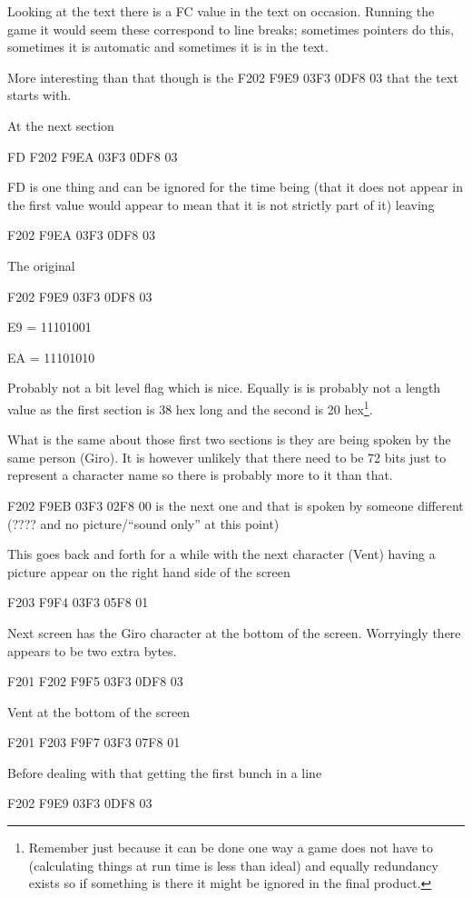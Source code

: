 \documentclass[
]{book}
\begin{document}
Looking at the text there is a FC value in the text on occasion. Running the game it would seem these correspond to line breaks; sometimes pointers do this, sometimes it is automatic and sometimes it is in the text.

More interesting than that though is the F202 F9E9 03F3 0DF8 03 that the text starts with.

At the next section

FD F202 F9EA 03F3 0DF8 03

FD is one thing and can be ignored for the time being (that it does not appear in the first value would appear to mean that it is not strictly part of it) leaving

F202 F9EA 03F3 0DF8 03

The original

F202 F9E9 03F3 0DF8 03

E9 = 11101001

EA = 11101010

Probably not a bit level flag which is nice. Equally is is probably not a length value as the first section is 38 hex long and the second is 20 hex\footnote{Remember just because it can be done one way a game does not have to (calculating things at run time is less than ideal) and equally redundancy exists so if something is there it might be ignored in the final product.}.

What is the same about those first two sections is they are being spoken by the same person (Giro). It is however unlikely that there need to be 72 bits just to represent a character name so there is probably more to it than that.

F202 F9EB 03F3 02F8 00 is the next one and that is spoken by someone different (???? and no picture/``sound only'' at this point)

This goes back and forth for a while with the next character (Vent) having a picture appear on the right hand side of the screen

F203 F9F4 03F3 05F8 01

Next screen has the Giro character at the bottom of the screen. Worryingly there appears to be two extra bytes.

F201 F202 F9F5 03F3 0DF8 03

Vent at the bottom of the screen

F201 F203 F9F7 03F3 07F8 01

Before dealing with that getting the first bunch in a line

F202 F9E9 03F3 0DF8 03
\end{document}
